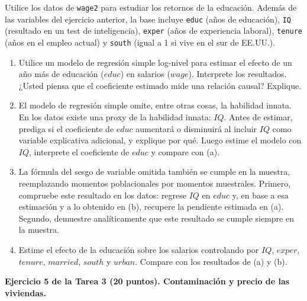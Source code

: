 \documentclass[letterpaper,11pt]{article}
\begin{document}
Utilice los datos de \texttt{wage2} para estudiar los retornos de la educación. Además de las
variables del ejercicio anterior, la base incluye \texttt{educ} (años de educación),
\texttt{IQ} (resultado en un test de inteligencia), \texttt{exper} (años de experiencia
laboral), \texttt{tenure} (años en el empleo actual) y \texttt{south} (igual a 1 si vive en el
sur de EE.UU.).
\begin{enumerate}
    \item Utilice un modelo de regresión simple log-nivel para estimar el efecto de un año más
    de educación ($educ$) en salarios ($wage$). Interprete los resultados. ¿Usted piensa que el
    coeficiente estimado mide una relación causal? Explique.
    \item El modelo de regresión simple omite, entre otras cosas, la habilidad innata. En los
    datos existe una proxy de la habilidad innata: $IQ$. Antes de estimar, prediga si el
    coeficiente de $educ$ aumentará o disminuirá al incluir $IQ$ como variable explicativa
    adicional, y explique por qué. Luego estime el modelo con $IQ$, interprete el coeficiente
    de $educ$ y compare con (a).
    \item La fórmula del sesgo de variable omitida también se cumple en la muestra,
    reemplazando momentos poblacionales por momentos muestrales. Primero, compruebe este
    resultado en los datos: regrese $IQ$ en $educ$ y, en base a esa estimación y a lo obtenido
    en (b), recupere la pendiente estimada en (a). Segundo, demuestre analíticamente que este
    resultado se cumple siempre en la muestra.
    \item Estime el efecto de la educación sobre los salarios controlando por $IQ$, $exper$,
    $tenure$, $married$, $south$ y $urban$. Compare con los resultados de (a) y (b).
\end{enumerate}

\vspace{1em}

\noindent\textbf{Ejercicio 5 de la Tarea 3 (20 puntos). Contaminación y precio de las
viviendas.}
\end{document}
